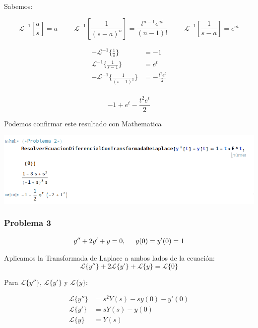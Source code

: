 \documentclass{article}
\begin{document}
Sabemos:

\[ \mathcal{L}^{-1}[\frac{a}{s}] = a \hspace{1cm} \mathcal{L}^{-1}[\frac{1}{(s-a)^n}] = \frac{t^{n-1}e^{at}}{(n-1)!} \hspace{1cm} \mathcal{L}^{-1}[\frac{1}{s-a}] = e^{at}\]

\begin{align*}
    -\mathcal{L}^{-1}\{\frac{1}{s}\}       & = -1                  \\
    \mathcal{L}^{-1}\{\frac{1}{s-1}\}      & = e^t                 \\
    -\mathcal{L}^{-1}\{\frac{1}{(s-1)^3}\} & = -\frac{t^2e^{t}}{2} \\
\end{align*}

\[-1 + e^t - \frac{t^2e^t}{2}\]

Podemos confirmar este resultado con Mathematica

\begin{center}
    \includegraphics[width=1\textwidth]{../../ED 2/image2.png}
\end{center}

\newpage


\subsubsection{Problema 3}
\[y'' + 2y' + y = 0, \hspace{.5cm} y(0) = y'(0) = 1\]

Aplicamos la Transformada de Laplace a ambos lados de la ecuación:
\[\mathcal{L}\{y''\} + 2\mathcal{L}\{y'\} + \mathcal{L}\{y\} = \mathcal{L}\{0\}\]

Para \(\mathcal{L}\{y''\}\), \(\mathcal{L}\{y'\}\) y \(\mathcal{L}\{y\}\):

\begin{align*}
    \mathcal{L}\{y''\} & = s^2Y(s) - sy(0) - y'(0) \\
    \mathcal{L}\{y'\}  & = sY(s) - y(0)            \\
    \mathcal{L}\{y\}   & = Y(s)
\end{align*}
\end{document}
